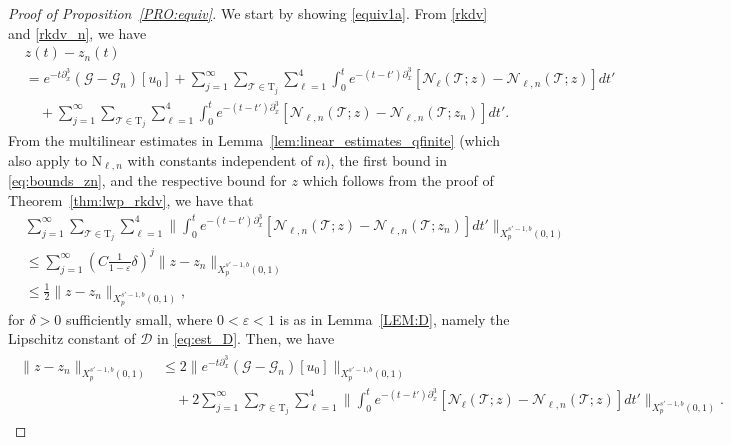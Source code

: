 \documentclass[a4paper,
11pt,  reqno]{amsart}
\newcommand{\5}{\textup{V}}
\newcommand{\dl}{\delta}
\newcommand{\eps}{\varepsilon}
\newcommand{\dx}{\partial_x}
\theoremstyle{remark}
\newcommand{\TT}{\mathcal{T}}
\newcommand{\Tr}{\mathrm{T}}
\renewcommand{\l}{\ell}
\newcommand{\Gc}{\mathcal{G}}
\numberwithin{equation}{section}
\numberwithin{theorem}{section}
\newcommand{\NN}{\mathrm{N}}
\newcommand{\Ncal}{\mathcal{N}}
\newcommand{\DD}{\mathcal{D}}
\begin{document}
\begin{proof}[Proof of Proposition~\ref{PRO:equiv}]
We start by showing \eqref{equiv1a}.
From \eqref{rkdv} and \eqref{rkdv_n}, we have
\begin{align}
&
z(t) - z_n(t)
\\
&
= e^{-t\dx^3} (\Gc - \Gc_n)[u_0]
+ \sum_{j=1}^\infty \sum_{\TT\in\Tr_j} \sum_{\l=1}^4 \int_0^t e^{-(t-t')\dx^3} [\Ncal_{\l}(\TT; z) - \Ncal_{\l, n}(\TT;z)]  dt'
\\
&
\quad
+ \sum_{j=1}^\infty \sum_{\TT\in\Tr_j} \sum_{\l=1}^4
\int_0^t e^{-(t-t')\dx^3} [\Ncal_{\l, n}(\TT; z) - \Ncal_{\l, n}(\TT;z_n)]  dt'.
\end{align}
From the multilinear estimates in Lemma~\ref{lem:linear_estimates_qfinite} (which also apply to $\NN_{\l,n}$ with constants independent of $n$), the first bound in \eqref{eq:bounds_zn}, and the respective bound for $z$ which follows from the proof of Theorem~\ref{thm:lwp_rkdv}, we have that
\begin{align}
&
\sum_{j=1}^\infty \sum_{\TT\in\Tr_j} \sum_{\l=1}^4
\bigg\|
\int_0^t e^{-(t-t')\dx^3} [\Ncal_{\l, n}(\TT; z) - \Ncal_{\l, n}(\TT;z_n)]  dt' \bigg\|_{X^{s'-1,b}_p(0,1)}
\\
&
\le \sum_{j=1}^\infty ( C \tfrac{1}{1-\eps} \dl )^{j} \| z-z_n\|_{X^{s'-1,b}_p(0,1)} \\
&
\le  \tfrac12 \| z-z_n\|_{X^{s'-1,b}_p(0,1)} ,
\end{align}
for $\dl>0$ sufficiently small, where $0<\eps<1$ is as in Lemma~\ref{LEM:D}, namely the Lipschitz constant of $\DD$ in \eqref{eq:est_D}.
Then, we have
\begin{align}
\label{equiv1aa}
\begin{split}
\| z - z_n \|_{X^{s'-1,b}_p(0,1)}
&
\le
2 \|e^{-t\dx^3} (\Gc - \Gc_n)[u_0]\|_{X^{s'-1,b}_p(0,1)}
\\
&
\quad
+
2
\sum_{j=1}^\infty \sum_{\TT\in\Tr_j} \sum_{\l=1}^4
\bigg\| \int_0^t e^{-(t-t')\dx^3} [\Ncal_{\l}(\TT; z) - \Ncal_{\l, n}(\TT;z)]  dt' \bigg\|_{X^{s'-1,b}_p(0,1)}.
\end{split}
\end{align}




\end{proof}
\end{document}
